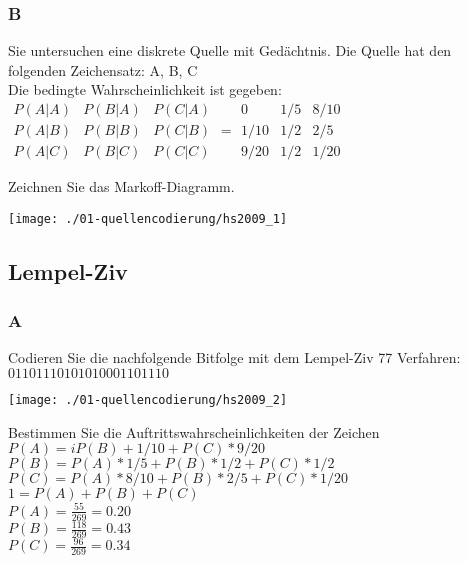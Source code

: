 \subsubsection{B}
Sie untersuchen eine diskrete Quelle mit Gedächtnis. Die Quelle hat den folgenden Zeichensatz: A, B, C\\
Die bedingte Wahrscheinlichkeit ist gegeben:\\
$\begin{matrix}
    P(A|A) & P(B|A) & P(C|A)\\
    P(A|B) & P(B|B) & P(C|B)\\
    P(A|C) & P(B|C) & P(C|C)
\end{matrix} = \begin{matrix}
    0 & 1/5 & 8/10\\
    1/10 & 1/2 & 2/5\\
    9/20 & 1/2 & 1/20
\end{matrix}$

Zeichnen Sie das Markoff-Diagramm.
\begin{center}
    \vspace{-8pt}
    \texttt{[image: ./01-quellencodierung/hs2009\_1]}
    \vspace{-8pt}
\end{center}

\columnbreak

\subsection{Lempel-Ziv}
\subsubsection{A}
Codieren Sie die nachfolgende Bitfolge mit dem Lempel-Ziv 77 Verfahren:\\
$01101110101010001101110$
\begin{center}
    \vspace{-8pt}
    \texttt{[image: ./01-quellencodierung/hs2009\_2]}
    \vspace{-8pt}
\end{center}

Bestimmen Sie die Auftrittswahrscheinlichkeiten der Zeichen\\
$P(A)=iP(B)+1/10+P(C)*9/20$\\
$P(B)=P(A)*1/5+P(B)*1/2+P(C)*1/2$\\
$P(C)=P(A)*8/10+P(B)*2/5+P(C)*1/20$\\
$1=P(A)+P(B)+P(C)$\\

$P(A)=\frac{55}{269}=0.20$\\
$P(B)=\frac{118}{269}=0.43$\\
$P(C)=\frac{96}{269}=0.34$






